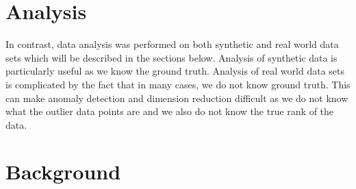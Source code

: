 \documentclass[conference]{IEEEtran}
\begin{document}
\section{Analysis}
In contrast, data analysis was performed on both synthetic and real world data sets which will be described in the sections below. Analysis of synthetic data is particularly useful as we know the ground truth. Analysis of real world data sets is complicated by the fact that in many cases, we do not know ground truth.  This can make anomaly detection and dimension reduction difficult as we do not know what the outlier data points are and we also do not know the true rank of the data.




\section{Background}
\end{document}
